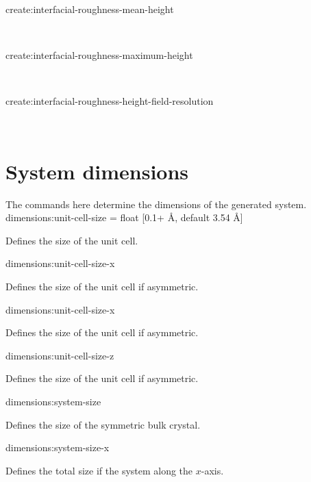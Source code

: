 {\zicf create:interfacial-roughness-mean-height}\\ \par

{\zicf create:interfacial-roughness-maximum-height}\\ \par

{\zicf create:interfacial-roughness-height-field-resolution}\\ \par

\section*{System dimensions}
The commands here determine the dimensions of the generated system.\\

{\zicf dimensions:unit-cell-size = float [0.1+ \AA, default 3.54 \AA]} Defines the size of the unit cell.\\ \par

{\zicf dimensions:unit-cell-size-x} Defines the size of the unit cell if asymmetric.\\ \par

{\zicf dimensions:unit-cell-size-x} Defines the size of the unit cell if asymmetric.\\ \par

{\zicf dimensions:unit-cell-size-z} Defines the size of the unit cell if asymmetric.\\ \par

{\zicf dimensions:system-size} Defines the size of the symmetric bulk crystal. \\ \par

{\zicf dimensions:system-size-x} Defines the total size if the system along the $x$-axis.\\ \par

